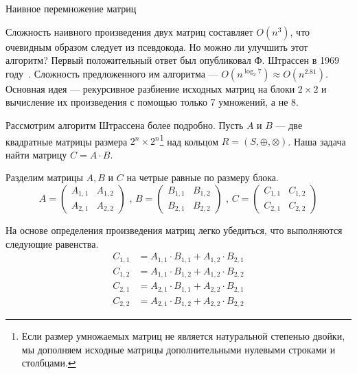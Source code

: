 \begin{algorithm}
\begin{algorithmic}[1]\label{algo:MxM}
\caption{Наивное перемножение матриц}
    \EndFor 
    \EndFor 
    \EndFor 

\EndFunction
\end{algorithmic}
\end{algorithm}

Сложность наивного произведения двух матриц составляет $O(n^3)$, что очевидным образом следует из псевдокода. Но можно ли улучшить этот алгоритм? Первый положительный ответ был опубликовал Ф. Штрассен в 1969 году~\cite{Strassen1969}. Сложность предложенного им алгоритма --- $O(n^{\log_2 7}) \approx O(n^{2.81})$. Основная идея --- рекурсивное разбиение исходных матриц на блоки $2 \times 2$ и вычисление их произведения с помощью только 7 умножений, а не 8.

Рассмотрим алгоритм Штрассена более подробно. Пусть $A$ и $B$ --- две квадратные матрицы размера $2^n \times 2^n$\footnote{Если размер умножаемых матриц не является натуральной степенью двойки, мы дополняем исходные матрицы дополнительными нулевыми строками и столбцами.} над кольцом $R=(S,\oplus,\otimes)$. Наша задача найти матрицу $C = A \cdot B$.

Разделим матрицы $A, B$ и $C$ на четрые равные по размеру блока.
$$
A =
\begin{pmatrix} 
  A_{1,1} & A_{1,2} \\
  A_{2,1} & A_{2,2}
 \end{pmatrix} \mbox{ , } 
 B =
 \begin{pmatrix}
   B_{1,1} & B_{1,2} \\
   B_{2,1} & B_{2,2}
 \end{pmatrix} \mbox{ , }
 C =
 \begin{pmatrix}
   C_{1,1} & C_{1,2} \\ 
   C_{2,1} & C_{2,2}
 \end{pmatrix}
$$

На основе определения произведения матриц легко убедиться, что выполняются следующие равенства.
\begin {align*}
C_{1,1}&= A_{1,1} \cdot B_{1,1} + A_{1,2} \cdot B_{2,1} \\
C_{1,2}&= A_{1,1} \cdot B_{1,2} + A_{1,2} \cdot B_{2,2} \\
C_{2,1}&= A_{2,1} \cdot B_{1,1} + A_{2,2} \cdot B_{2,1} \\
C_{2,2}&= A_{2,1} \cdot B_{1,2} + A_{2,2} \cdot B_{2,2} 
\end {align*}

